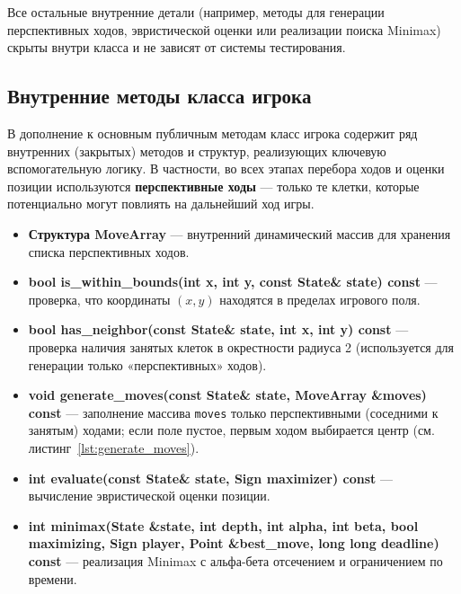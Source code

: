 \noindent Все остальные внутренние детали (например, методы для генерации перспективных ходов, эвристической оценки или реализации поиска Minimax) скрыты внутри класса и не зависят от системы тестирования.

\subsection{Внутренние методы класса игрока}

В дополнение к основным публичным методам класс игрока содержит ряд внутренних (закрытых) методов и структур, реализующих ключевую вспомогательную логику. В частности, во всех этапах перебора ходов и оценки позиции используются \textbf{перспективные ходы} — только те клетки, которые потенциально могут повлиять на дальнейший ход игры.


\begin{itemize}
    \item \textbf{Структура MoveArray} — внутренний динамический массив для хранения списка перспективных ходов.

    \item \textbf{bool is\_within\_bounds(int x, int y, const State\& state) const} — проверка, что координаты $(x, y)$ находятся в пределах игрового поля.

    \item \textbf{bool has\_neighbor(const State\& state, int x, int y) const} — проверка наличия занятых клеток в окрестности радиуса 2 (используется для генерации только «перспективных» ходов).

    \item \textbf{void generate\_moves(const State\& state, MoveArray \&moves) const} — заполнение массива \verb|moves| только перспективными (соседними к занятым) ходами; если поле пустое, первым ходом выбирается центр (см. листинг~\ref{lst:generate_moves}).

    \item \textbf{int evaluate(const State\& state, Sign maximizer) const} — вычисление эвристической оценки позиции.

    \item \textbf{int minimax(State \&state, int depth, int alpha, int beta, bool maximizing, Sign player, Point \&best\_move, long long deadline) const} — реализация Minimax с альфа-бета отсечением и ограничением по времени.
\end{itemize}

\vspace{0.5em}

